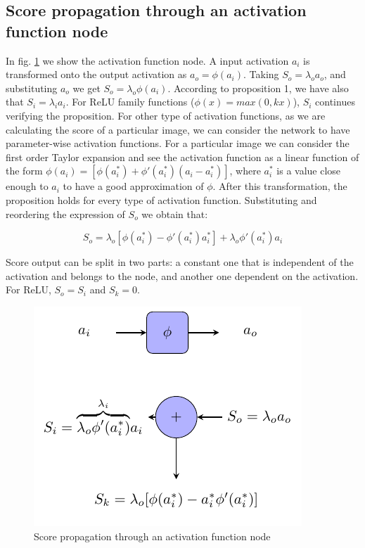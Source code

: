 \documentclass[review]{elsarticle}
\theoremstyle{definition} %
\theoremstyle{remark}
\begin{document}
\subsection{Score propagation through an activation function node} 

In fig. \ref{fig:score_af} we show the activation function node. A input activation $a_i$ is transformed onto the output activation as $a_o = \phi(a_i)$. Taking $S_o = \lambda_o a_o$, and substituting $a_o$ we get $S_o = \lambda_o \phi(a_i)$. According to proposition 1, we have also that $S_i = \lambda_i a_i$. For ReLU family functions ($\phi(x) = max(0, kx)$), $S_i$ continues verifying the proposition. For other type of activation functions, as we are calculating the score of a particular image, we can consider the network to have parameter-wise activation functions. For a particular image we can consider the first order Taylor expansion and see the activation function as a linear function of the form $\phi(a_i) = [\phi(a^*_i) + \phi'(a^*_i)(a_i - a^*_i)]$, where $a^*_i$ is a value close enough to $a_i$ to have a good approximation of $\phi$. After this transformation, the proposition holds for every type of activation function. Substituting and reordering the expression of $S_o$ we obtain that:

\begin{equation}
	S_o = \lambda_o[\phi(a^*_i) - \phi'(a^*_i)a^*_i] + \lambda_o \phi'(a^*_i)a_i
\end{equation}

Score output can be split in two parts: a constant one that is independent of the activation and belongs to the node, and another one dependent on the activation. For ReLU, $S_o = S_i$ and $S_k = 0$.

\begin{figure}[!ht]
	\centering
	\includegraphics{./figures/score_af.pdf}
	\caption{Score propagation through an activation function node}
	\label{fig:score_af}
\end{figure}
\end{document}
